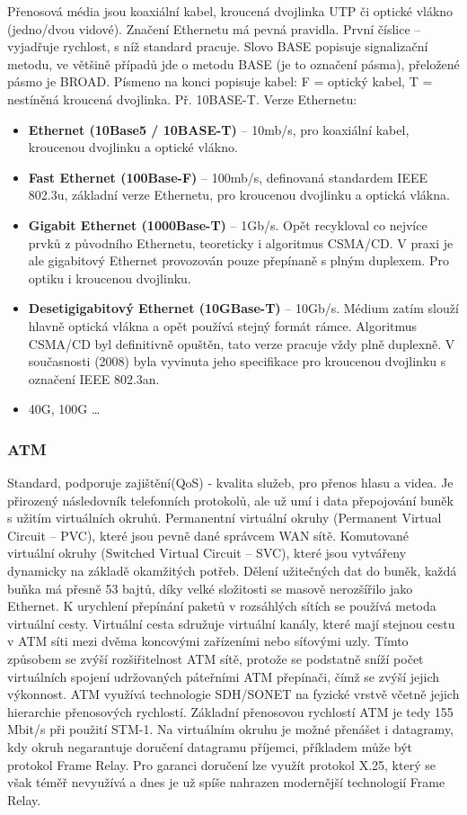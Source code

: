 Přenosová média jsou koaxiální kabel, kroucená dvojlinka UTP či optické vlákno (jedno/dvou vidové). Značení Ethernetu má pevná pravidla. První číslice – 
vyjadřuje rychlost, s níž standard pracuje. Slovo BASE popisuje signalizační metodu, ve většině případů jde o metodu BASE (je to označení pásma), přeložené pásmo je BROAD.
Písmeno na konci popisuje kabel: F = optický kabel, T = nestíněná kroucená dvojlinka. Př. 10BASE-T. Verze Ethernetu:
\begin{itemize}
\item \textbf{Ethernet (10Base5 / 10BASE-T)} -- 10mb/s, pro koaxiální kabel, kroucenou dvojlinku a optické vlákno.
\item \textbf{Fast Ethernet (100Base-F)} -- 100mb/s, definovaná standardem IEEE 802.3u, základní verze Ethernetu, pro kroucenou dvojlinku a optická vlákna. 
\item \textbf{Gigabit Ethernet (1000Base-T)} -- 1Gb/s. Opět recykloval co nejvíce prvků z původního Ethernetu, teoreticky i algoritmus CSMA/CD. V praxi je ale gigabitový Ethernet provozován pouze přepínaně s plným duplexem. Pro optiku i kroucenou dvojlinku.
\item \textbf{Desetigigabitový Ethernet (10GBase-T)} -- 10Gb/s. Médium zatím slouží hlavně optická vlákna a opět používá stejný formát rámce. Algoritmus CSMA/CD byl definitivně opuštěn, tato verze pracuje vždy plně duplexně. V současnosti (2008) byla vyvinuta jeho specifikace pro kroucenou dvojlinku s označení IEEE 802.3an.
\item 40G, 100G \ldots
\end{itemize}


\subsubsection{ATM}
Standard, podporuje zajištění(QoS) - kvalita služeb, pro přenos hlasu a videa. Je přirozený následovník telefonních protokolů, ale už umí i data přepojování buněk s užitím virtuálních okruhů. Permanentní virtuální okruhy (Permanent Virtual Circuit – PVC), které jsou pevně dané správcem WAN sítě.
Komutované virtuální okruhy (Switched Virtual Circuit – SVC), které jsou vytvářeny dynamicky na základě okamžitých potřeb. Dělení užitečných dat do buněk, každá buňka má přesně
53 bajtů, díky velké složitosti se masově nerozšířilo jako Ethernet.
K urychlení přepínání paketů v rozsáhlých sítích se používá metoda virtuální cesty. Virtuální cesta sdružuje  virtuální kanály, které mají stejnou cestu v ATM síti mezi dvěma koncovými zařízeními nebo síťovými uzly. Tímto způsobem se zvýší rozšiřitelnost ATM sítě, protože se podstatně sníží počet virtuálních spojení udržovaných páteřními ATM přepínači, čímž se zvýší jejich výkonnost.
ATM využívá technologie SDH/SONET na fyzické vrstvě včetně jejich hierarchie přenosových rychlostí. Základní přenosovou rychlostí ATM je tedy 155 Mbit/s při použití  STM-1.
Na virtuálním okruhu je možné přenášet i datagramy, kdy okruh negarantuje doručení datagramu příjemci, příkladem může být protokol Frame Relay. Pro garanci doručení lze využít protokol X.25, který se však téměř nevyužívá a dnes je už spíše nahrazen modernější technologií Frame Relay.

